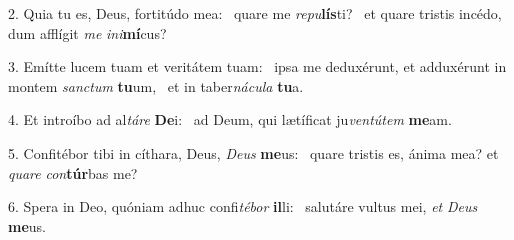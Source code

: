 2. Quia tu es, Deus, fortitúdo mea: \dag\  quare me \textit{re}\textit{pu}\textbf{lís}ti? \ast\  et quare tristis incédo, dum afflígit \textit{me} \textit{in}\textit{i}\textbf{mí}cus?\

3. Emítte lucem tuam et veritátem tuam: \dag\  ipsa me deduxérunt, et adduxérunt in montem \textit{sanc}\textit{tum} \textbf{tu}um, \ast\  et in taber\textit{ná}\textit{cu}\textit{la} \textbf{tu}a.\

4. Et introíbo ad al\textit{tá}\textit{re} \textbf{De}i: \ast\  ad Deum, qui lætíficat ju\textit{ven}\textit{tú}\textit{tem} \textbf{me}am.\

5. Confitébor tibi in cíthara, Deus, \textit{De}\textit{us} \textbf{me}us: \ast\  quare tristis es, ánima mea? et \textit{qua}\textit{re} \textit{con}\textbf{túr}bas me?\

6. Spera in Deo, quóniam adhuc confi\textit{té}\textit{bor} \textbf{il}li: \ast\  salutáre vultus mei, \textit{et} \textit{De}\textit{us} \textbf{me}us.\

